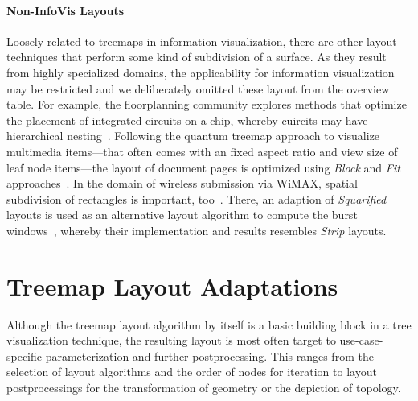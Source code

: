 \documentclass[sigconf%
,natbib=true%
]{acmart}
\begin{document}
\paragraph{\textbf{Non-InfoVis Layouts}}
Loosely related to treemaps in information visualization, there are other layout techniques that perform some kind of subdivision of a surface.
As they result from highly specialized domains, the applicability for information visualization may be restricted and we deliberately omitted these layout from the overview table.
For example, the floorplanning community explores methods that optimize the placement of integrated circuits on a chip, whereby cuircits may have hierarchical nesting~\cite{he2008-zerodeadspace}.
Following the quantum treemap approach to visualize multimedia items---that often comes with an fixed aspect ratio and view size of leaf node items---the layout of document pages is optimized using \emph{Block} and \emph{Fit} approaches~\cite{deOliveira2008-pagelayout}.
In the domain of wireless submission via WiMAX, spatial subdivision of rectangles is important, too~\cite{soin2009-ocsa}.
There, an adaption of \emph{Squarified} layouts is used as an alternative layout algorithm to compute the burst windows~\cite{vanderpypen2011-burstmapping}, whereby their implementation and results resembles \emph{Strip} layouts.

\section{Treemap Layout Adaptations}
Although the treemap layout algorithm by itself is a basic building block in a tree visualization technique, the resulting layout is most often target to use-case-specific parameterization and further postprocessing.
This ranges from the selection of layout algorithms and the order of nodes for iteration to layout postprocessings for the transformation of geometry or the depiction of topology.
\end{document}
